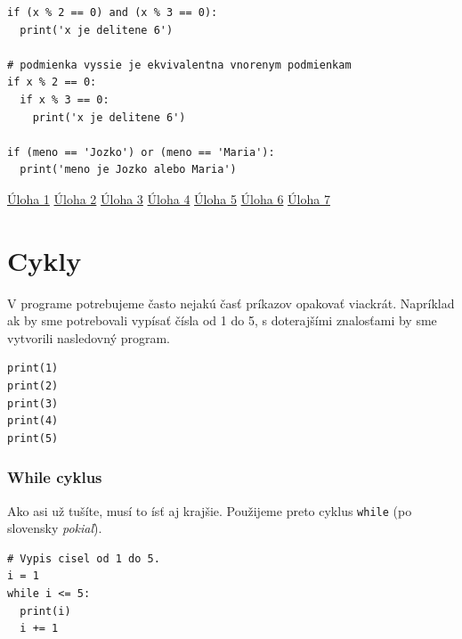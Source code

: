 \documentclass{article}
\begin{document}
\begin{lstlisting}
if (x % 2 == 0) and (x % 3 == 0):
  print('x je delitene 6')

# podmienka vyssie je ekvivalentna vnorenym podmienkam
if x % 2 == 0:
  if x % 3 == 0:
    print('x je delitene 6')

if (meno == 'Jozko') or (meno == 'Maria'):
  print('meno je Jozko alebo Maria')
\end{lstlisting}

\href{https://testovac.ksp.sk/tasks/ls-uvod-rovnake/}{Úloha 1}
\href{https://testovac.ksp.sk/tasks/ls-uvod-znamienko/}{Úloha 2}
\href{https://testovac.ksp.sk/tasks/ls-uvod-najmensi/}{Úloha 3}
\href{https://testovac.ksp.sk/tasks/ls-uvod-prostredny/}{Úloha 4}
\href{https://testovac.ksp.sk/tasks/ls-uvod-priemer/}{Úloha 5}
\href{https://testovac.ksp.sk/tasks/ls-uvod-zvysok/}{Úloha 6}
\href{https://testovac.ksp.sk/tasks/ls-uvod-nenajvacsi/}{Úloha 7}

\section{Cykly}
V programe potrebujeme často nejakú časť príkazov opakovať viackrát. Napríklad ak by sme potrebovali vypísať čísla od 1 do 5, s doterajšími znalosťami by sme vytvorili nasledovný program.
\begin{lstlisting}
print(1)
print(2)
print(3)
print(4)
print(5)
\end{lstlisting}

\subsubsection{While cyklus}
Ako asi už tušíte, musí to ísť aj krajšie. Použijeme preto cyklus \texttt{while} (po slovensky \textit{pokiaľ}).
\begin{lstlisting}
# Vypis cisel od 1 do 5.
i = 1
while i <= 5:
  print(i)
  i += 1
\end{lstlisting}

\end{document}
